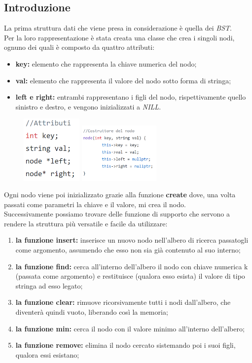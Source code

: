 \documentclass[a4paper]{article}
\begin{document}
			\subsection{Introduzione}
				La prima struttura dati che viene presa in considerazione è quella dei \textit{BST}. \\
				Per la loro rappresentazione è stata creata una classe che crea i singoli nodi, ognuno dei quali è composto da quattro attributi:
				\begin{itemize}
					\item \textbf{key:} elemento che rappresenta la chiave numerica del nodo;
					\item \textbf{val:} elemento che rappresenta il valore del nodo sotto forma di stringa;
					\item \textbf{left e right:} entrambi rappresentano i figli del nodo, rispettivamente quello sinistro e destro, e vengono inizializzati a \textit{NILL}.
				\end{itemize}
			    \begin{figure}[ht]
			    	\includegraphics[width=3cm]{Attributi}
			    	\includegraphics[width=4cm]{Creatore1}
			    \end{figure}
		    	Ogni nodo viene poi inizializzato grazie alla funzione \textbf{create} dove, una volta passati come parametri la chiave e il valore, mi crea il nodo. \\
		    	Successivamente possiamo trovare delle funzione di supporto che servono a rendere la struttura più versatile e facile da utilizzare:
		    	\begin{enumerate}
		    		\item \textbf{la funzione insert:} inserisce un nuovo nodo nell'albero di ricerca passatogli come argomento, assumendo che esso non sia già contenuto al suo interno;
		    		\item \textbf{la funzione find:} cerca all'interno dell'albero il nodo con chiave numerica k (passata come argomento) e restituisce (qualora esso esista) il valore di tipo stringa ad esso legato;
		    		\item \textbf{la funzione clear:} rimuove ricorsivamente tutti i nodi dall'albero, che diventerà quindi vuoto, liberando così la memoria;
		    		\item \textbf{la funzione min:} cerca il nodo con il valore minimo all'interno dell'albero;
		    		\item \textbf{la funzione remove:} elimina il nodo cercato sistemando poi i suoi figli, qualora essi esistano;
		    	\end{enumerate}
		 \newpage
\end{document}
